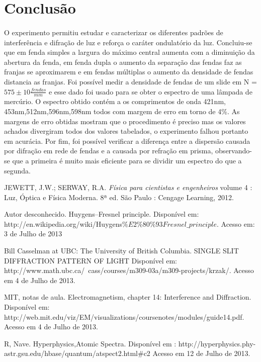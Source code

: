 \documentclass[a4paper,11pt]{article}
\begin{document}
\section{Conclusão}

\paragraph{}O experimento permitiu estudar e caracterizar 
os diferentes padrões de interferência e difração de luz e
reforça o caráter ondulatório da luz. Concluiu-se que em
fenda simples a largura do máximo central aumenta com a 
diminuição da abertura da fenda, em fenda dupla o aumento
da separação das fendas faz as franjas se aproximarem e
em fendas múltiplas o aumento da densidade de fendas
distancia as franjas. Foi possível medir a densidade
de fendas de um slide em N =$575 \pm 10\frac{fendas}{mm}$ e esse dado foi
usado para se obter o espectro de uma lâmpada
de mercúrio. O espectro obtido contém a os comprimentos de
onda 421nm, 453nm,512nm,596nm,598nm todos com margem de erro  
em torno de 4\%. As margens de erro obtidas mostram que o 
procedimento é preciso mas os valores achados divergiram
todos dos valores tabelados, o experimento falhou
portanto em acurácia. Por fim, foi possível verificar
a diferença entre a dispersão causada por difração em rede
de fendas e a causada por refração em prisma, observando-se
que a primeira é muito mais eficiente para se dividir um
espectro do que a segunda.
\begin{thebibliography}{9}    
  		JEWETT, J.W.; SERWAY, R.A.
  		\emph{Física para cientistas e engenheiros}
volume 4 : Luz, Óptica e Física Moderna.
 		 8ª ed.
 		 São Paulo : Cengage Learning, 2012.
 		 
 		Autor desconhecido. Huygens–Fresnel principle. Disponível
em: http://en.wikipedia.org/wiki/Huygens$\%E2\%80\%93Fresnel\_principle$.
Acesso em: 3 de Julho de 2013
  	
  	Bill Casselman at UBC:
The University of British Columbia. 
  	SINGLE SLIT DIFFRACTION PATTERN OF LIGHT	 
  	Disponível em:
	http://www.math.ubc.ca/~cass/courses/m309-03a/m309-projects/krzak/.
  	Acesso em 4 de Julho de 2013.
  		
  	MIT, notas de aula. Electromagnetism, chapter 14:
			 Interference and Diffraction. Disponível em: 
       http://web.mit.edu/viz/EM/visualizations/coursenotes/modules/guide14.pdf.
	 Acesso em 4 de Julho de 2013.

	R, Nave. Hyperphysics,Atomic Spectra. 
	Disponível em :
http://hyperphysics.phy-astr.gsu.edu/hbase/quantum/atspect2.html\#c2
	Acesso em 12 de Julho de 2013.
  		
\end{thebibliography}
\end{document}
